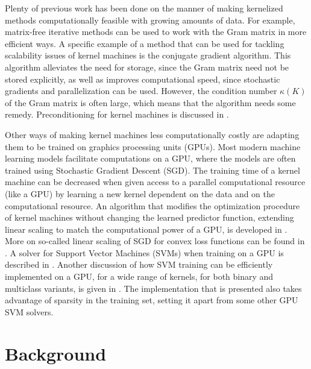 \documentclass{article}
\theoremstyle{plain}
\theoremstyle{definition}
\theoremstyle{remark}
\begin{document}
Plenty of previous work has been done on the manner of making kernelized methods computationally feasible with growing amounts of data. 
For example, matrix-free iterative methods can be used to work with the Gram matrix in more efficient ways. A specific example of a method that can be used for tackling scalability issues of kernel machines is the conjugate gradient algorithm. This algorithm alleviates the need for storage, since the Gram matrix need not be stored explicitly, as well as improves computational speed, since stochastic gradients and parallelization can be used. However, the condition number $\kappa(K)$ of the Gram matrix is often large, which means that the algorithm needs some remedy. Preconditioning for kernel machines is discussed in \cite{cutajar}.

Other ways of making kernel machines less computationally costly are adapting them to be trained on graphics processing units (GPUs). Most modern machine learning models facilitate computations on a GPU, where the models are often trained using Stochastic Gradient Descent (SGD). The training time of a kernel machine can be decreased when given access to a parallel computational resource (like a GPU) by learning a new kernel dependent on the data and on the computational resource. An algorithm that modifies the optimization procedure of kernel machines without changing the learned predictor function, extending linear scaling to match the computational power of a GPU, is developed in \cite{belkin}. More on so-called linear scaling of SGD for convex loss functions can be found in \cite{Ma}. A solver for Support Vector Machines (SVMs) when training on a GPU is described in \cite{sundaram_acceleratingmachine}. Another discussion of how SVM training can be efficiently implemented on a GPU, for a wide range of kernels, for both binary and multiclass variants, is given in \cite{cotter}. The implementation that is presented also takes advantage of sparsity in the training set, setting it apart from some other GPU SVM solvers. 


\section{Background}
\end{document}
